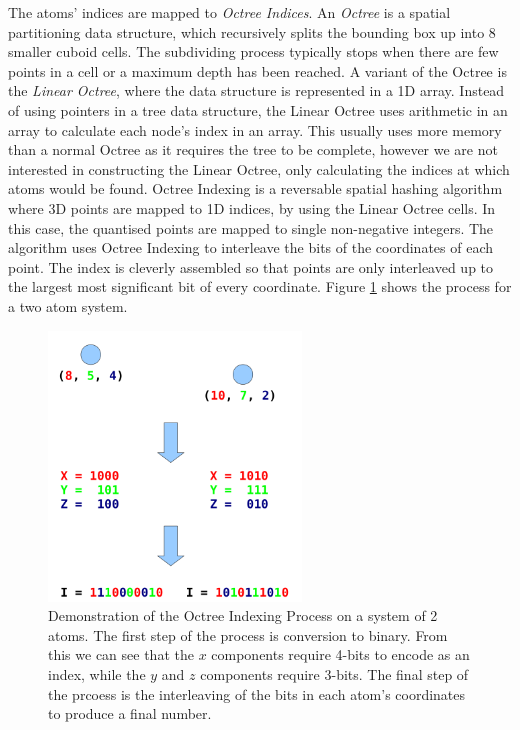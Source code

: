 \documentclass[a4paper,11pt]{report}
\begin{document}
The atoms' indices are mapped to \emph{Octree Indices}. An \emph{Octree} is a spatial partitioning data structure\cite{wilhelms1992octrees}, which recursively splits the bounding box up into 8 smaller cuboid cells. The subdividing process typically stops when there are few points in a cell or a maximum depth has been reached. A variant of the Octree is the \emph{Linear Octree}\cite{chuang1995efficient}, where the data structure is represented in a 1D array. Instead of using pointers in a tree data structure, the Linear Octree uses arithmetic in an array to calculate each node's index in an array. This usually uses more memory than a normal Octree as it requires the tree to be complete, however we are not interested in constructing the Linear Octree, only calculating the indices at which atoms would be found. Octree Indexing is a reversable spatial hashing algorithm where 3D points are mapped to 1D indices, by using the Linear Octree cells. In this case, the quantised points are mapped to single non-negative integers. The algorithm uses Octree Indexing to interleave the bits of the coordinates of each point. The index is cleverly assembled so that points are only interleaved up to the largest most significant bit of every coordinate. Figure \ref{octree} shows the process for a two atom system.

\begin{figure}[!h]
 \center
 \includegraphics[width=0.6\textwidth]{resources/OctreeIndexingVerticalCropped.png}
\caption{Demonstration of the Octree Indexing Process on a system of 2 atoms. The first step of the process is conversion to binary. From this we can see that the $x$ components require 4-bits to encode as an index, while the $y$ and $z$ components require 3-bits. The final step of the prcoess is the interleaving of the bits in each atom's coordinates to produce a final number.}
\label{octree}
\end{figure}
\end{document}
